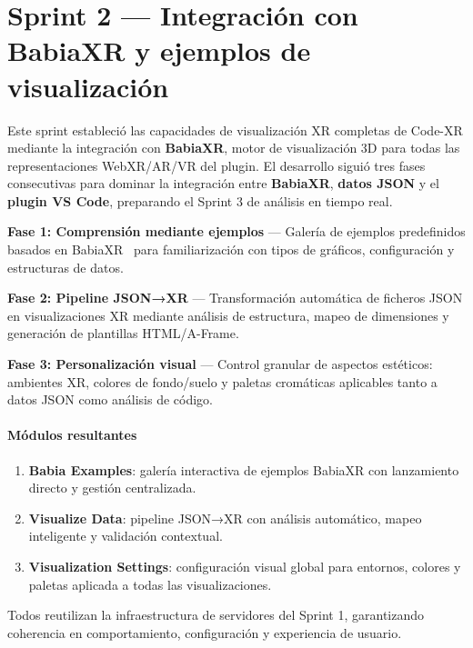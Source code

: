 \documentclass[a4paper, 12pt]{book}
\begin{document}

\section{Sprint 2 — Integración con BabiaXR y ejemplos de visualización}
\label{sec:sprint-babiaxr}

Este sprint estableció las capacidades de visualización XR completas de Code-XR mediante la integración con \textbf{BabiaXR}, motor de visualización 3D para todas las representaciones WebXR/AR/VR del plugin. El desarrollo siguió tres fases consecutivas para dominar la integración entre \textbf{BabiaXR}, \textbf{datos JSON} y el \textbf{plugin VS Code}, preparando el Sprint 3 de análisis en tiempo real.

\textbf{Fase 1: Comprensión mediante ejemplos} — Galería de ejemplos predefinidos basados en BabiaXR~\cite{babiaxr-examples} para familiarización con tipos de gráficos, configuración y estructuras de datos.

\textbf{Fase 2: Pipeline JSON→XR} — Transformación automática de ficheros JSON en visualizaciones XR mediante análisis de estructura, mapeo de dimensiones y generación de plantillas HTML/A-Frame.

\textbf{Fase 3: Personalización visual} — Control granular de aspectos estéticos: ambientes XR, colores de fondo/suelo y paletas cromáticas aplicables tanto a datos JSON como análisis de código.

\paragraph{Módulos resultantes}
\begin{enumerate}
  \item \textbf{Babia Examples}: galería interactiva de ejemplos BabiaXR con lanzamiento directo y gestión centralizada.
  \item \textbf{Visualize Data}: pipeline JSON→XR con análisis automático, mapeo inteligente y validación contextual.
  \item \textbf{Visualization Settings}: configuración visual global para entornos, colores y paletas aplicada a todas las visualizaciones.
\end{enumerate}

Todos reutilizan la infraestructura de servidores del Sprint 1, garantizando coherencia en comportamiento, configuración y experiencia de usuario.
\end{document}
